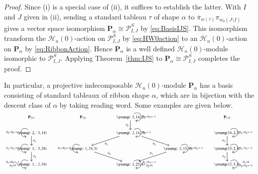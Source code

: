 \documentclass{amsart}
\newtheorem*{Young's Rule}{Young's Rule}
\theoremstyle{definition}
\theoremstyle{remark}
\numberwithin{equation}{section}
\begin{document}
\begin{proof}
Since (i) is a special case of (ii), it suffices to establish the latter. With $I$ and $J$ given in (ii), sending a standard tableau $\tau$ of shape $\alpha$ to ${\overline{\pi}}_{w(\tau)}\pi_{w_0(J\setminus I)}$ gives a vector space isomorphism ${\mathbf{P}}_\alpha\cong{\mathcal{P}_{I,J}^S}$ by  \eqref{eq:BasisIJS}. This isomorphism transform the ${\mathcal{H}}_n(0)$-action on ${\mathcal{P}_{I,J}^S}$ by \eqref{eq:HW0action} to an ${\mathcal{H}}_n(0)$-action on ${\mathbf{P}}_\alpha$ by \eqref{eq:RibbonAction}. Hence ${\mathbf{P}}_\alpha$ is a well defined ${\mathcal{H}}_n(0)$-module isomorphic to ${\mathcal{P}_{I,J}^S}$. Applying Theorem~\ref{thm:IJS} to ${\mathbf{P}}_\alpha\cong{\mathcal{P}_{I,J}^S}$ completes the proof.
\end{proof}

In particular, a projective indecomposable ${\mathcal{H}}_n(0)$-module ${\mathbf{P}}_\alpha$ has a basis consisting of standard tableaux of ribbon shape $\alpha$, which are in bijection with the descent class of $\alpha$ by taking reading word. Some examples are given below.
\[ \scriptsize
\xymatrix @R=16pt @C=28pt { {\mathbf{P}}_{211} \\
 {\young(:2,:3,14)}  \ar@(ul,dl)[]_{{\overline{\pi}}_2={\overline{\pi}}_3=-1} \ar[d]^-{{\overline{\pi}}_1}\\
 {\young(:1,:3,24)} \ar@(ul,dl)[]_{{\overline{\pi}}_1={\overline{\pi}}_3=-1} \ar[d]^-{{\overline{\pi}}_2} \\
{\young(:1,:2,34)} \ar@(ul,dl)[]_{\txt{$\substack{{\overline{\pi}}_1={\overline{\pi}}_2=-1 \\ {\overline{\pi}}_3=0}$}}  
}\qquad
\xymatrix @R=16pt @C=28pt {
{\mathbf{P}}_{121} & {\young(:3,14,2)}  \ar@(ur,dr)[]^{{\overline{\pi}}_1={\overline{\pi}}_3=-1} \ar[d]_-{{\overline{\pi}}_2}\\
& {\young(:2,14,3)} \ar@(ur,dr)[]^{{\overline{\pi}}_2=-1} \ar[ld]^-{{\overline{\pi}}_1} \ar[rd]_-{{\overline{\pi}}_3} \\
{\young(:1,24,3)} \ar@(ul,dl)[]_{{\overline{\pi}}_1={\overline{\pi}}_2=-1} \ar[rd]^-{{\overline{\pi}}_3} & &
{\young(:2,13,4)} \ar@(ur,dr)[]^{{\overline{\pi}}_2={\overline{\pi}}_3=-1} \ar[ld]_-{{\overline{\pi}}_1} \\
& {\young(:1,23,4)} \ar@(ur,dr)[]^{\txt{$\substack{{\overline{\pi}}_1={\overline{\pi}}_3=-1\\ {\overline{\pi}}_2=0}$}} 
}\qquad
\xymatrix @R=16pt @C=28pt { {\mathbf{P}}_{112} \\
 {\young(14,2,3)}  \ar@(ur,dr)[]^{{\overline{\pi}}_1={\overline{\pi}}_2=-1} \ar[d]_-{{\overline{\pi}}_3}\\
 {\young(13,2,4)} \ar@(ur,dr)[]^{{\overline{\pi}}_1={\overline{\pi}}_3=-1} \ar[d]_-{{\overline{\pi}}_2} \\
{\young(12,3,4)} \ar@(ur,dr)[]^{\txt{$\substack{{\overline{\pi}}_1=0\\ {\overline{\pi}}_2={\overline{\pi}}_3=-1}$}} }
\]\vskip5pt 
\end{document}
